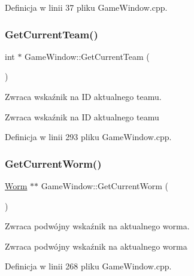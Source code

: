 Definicja w linii 37 pliku Game\+Window.\+cpp.

\mbox{\label{class_game_window_a67485df550fda5b1cc0aa6e7644f72e8}} 
\subsubsection{\texorpdfstring{Get\+Current\+Team()}{GetCurrentTeam()}}
{\footnotesize\ttfamily int $\ast$ Game\+Window\+::\+Get\+Current\+Team (\begin{DoxyParamCaption}{ }\end{DoxyParamCaption})}



Zwraca wskaźnik na ID aktualnego team\textquotesingle{}u. 

\begin{DoxyReturn}{Zwraca}
wskaźnik na ID aktualnego team\textquotesingle{}u 
\end{DoxyReturn}


Definicja w linii 293 pliku Game\+Window.\+cpp.

\mbox{\label{class_game_window_a172c7184152f5c49a5089205ae3528f5}} 
\subsubsection{\texorpdfstring{Get\+Current\+Worm()}{GetCurrentWorm()}}
{\footnotesize\ttfamily \mbox{\hyperlink{class_worm}{Worm}} $\ast$$\ast$ Game\+Window\+::\+Get\+Current\+Worm (\begin{DoxyParamCaption}{ }\end{DoxyParamCaption})}



Zwraca podwójny wskaźnik na aktualnego worma. 

\begin{DoxyReturn}{Zwraca}
podwójny wskaźnik na aktualnego worma 
\end{DoxyReturn}


Definicja w linii 268 pliku Game\+Window.\+cpp.

\mbox{\label{class_game_window_a6dbc377a22fff8ab01f30b10337dc5ae}} 
